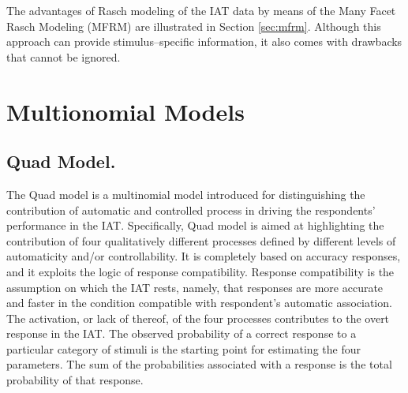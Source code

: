 \documentclass[12pt]{book}
\begin{document}
The advantages of Rasch modeling of the IAT data by means of the Many Facet Rasch Modeling (MFRM) are illustrated in Section \ref{sec:mfrm}. Although this approach can provide stimulus--specific information, it also comes with drawbacks that cannot be ignored. 


\newpage
\section{Multionomial Models}\label{sec:multimodel}
\subsection{Quad Model.}\label{sub:quad}
The Quad model \cite{Conrey2005} is a multinomial model introduced for distinguishing the contribution of automatic and controlled process in driving the respondents' performance in the IAT. Specifically, Quad model is aimed at highlighting the contribution of four qualitatively different processes defined by different levels of automaticity and/or controllability.  It is completely based on accuracy responses, and it exploits the logic of response compatibility. Response compatibility is the assumption on which the IAT rests, namely, that responses are more accurate and faster in the condition compatible with respondent's automatic association. 
The activation, or lack of thereof, of the four processes contributes to the overt response in the IAT. 
The observed probability of a correct response to a particular category of stimuli is the starting point for estimating the four parameters. The sum of the probabilities associated with a response is the total probability of that response. 
\end{document}
